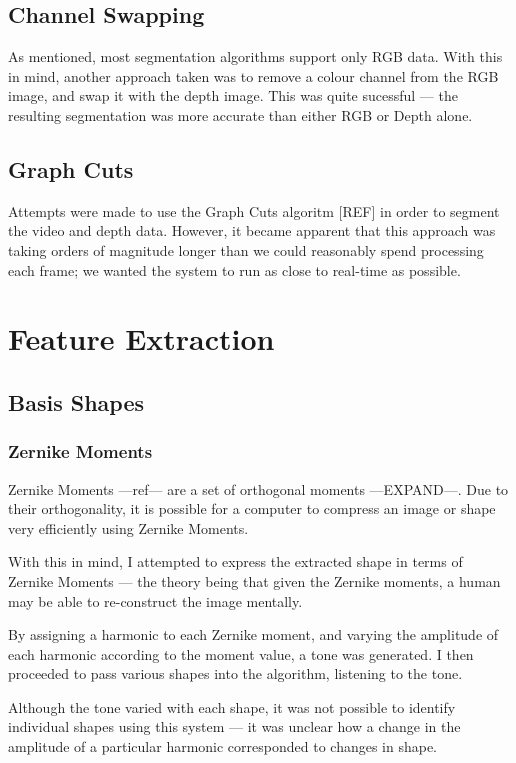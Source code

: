 \subsection{Channel Swapping}
As mentioned, most segmentation algorithms support only RGB data. With this in mind, another approach taken was to remove a colour channel from the RGB image, and swap it with the depth image. This was quite sucessful --- the resulting segmentation was more accurate than either RGB or Depth alone.

\subsection{Graph Cuts}
Attempts were made to use the Graph Cuts algoritm [REF] in order to segment the video and depth data. However, it became apparent that this approach was taking orders of magnitude longer than we could reasonably spend processing each frame; we wanted the system to run as close to real-time as possible.

\section{Feature Extraction}

\subsection{Basis Shapes}

\subsubsection{Zernike Moments}
Zernike Moments ---ref--- are a set of orthogonal moments ---EXPAND---. Due to their orthogonality, it is possible for a computer to compress an image or shape very efficiently using Zernike Moments. 

With this in mind, I attempted to express the extracted shape in terms of Zernike Moments --- the theory being that given the Zernike moments, a human may be able to re-construct the image mentally.

By assigning a harmonic to each Zernike moment, and varying the amplitude of each harmonic according to the moment value, a tone was generated. I then proceeded to pass various shapes into the algorithm, listening to the tone.

Although the tone varied with each shape, it was not possible to identify individual shapes using this system --- it was unclear how a change in the amplitude of a particular harmonic corresponded to changes in shape. 

